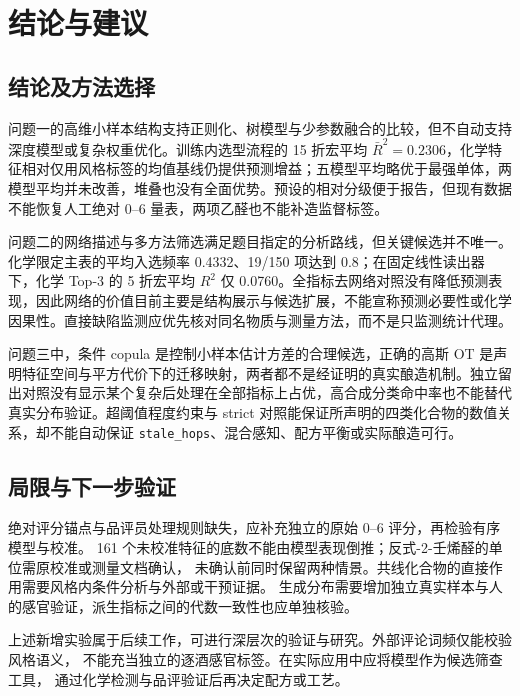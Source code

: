 \documentclass[UTF8,a4paper,zihao=-4]{ctexart}
\numberwithin{figure}{section}
\numberwithin{table}{section}
\numberwithin{equation}{section}
\newcommand{\file}[1]{\texttt{#1}}
\begin{document}
\section{结论与建议}
\label{sec:conclusion}

\subsection{结论及方法选择}

问题一的高维小样本结构支持正则化、树模型与少参数融合的比较，但不自动支持深度模型或复杂权重优化。训练内选型流程的 15 折宏平均 $\bar R^2=0.2306$，化学特征相对仅用风格标签的均值基线仍提供预测增益；五模型平均略优于最强单体，两模型平均并未改善，堆叠也没有全面优势。预设的相对分级便于报告，但现有数据不能恢复人工绝对 0--6 量表，两项乙醛也不能补造监督标签。

问题二的网络描述与多方法筛选满足题目指定的分析路线，但关键候选并不唯一。化学限定主表的平均入选频率 0.4332、19/150 项达到 0.8；在固定线性读出器下，化学 Top-3 的 5 折宏平均 $R^2$ 仅 0.0760。全指标去网络对照没有降低预测表现，因此网络的价值目前主要是结构展示与候选扩展，不能宣称预测必要性或化学因果性。直接缺陷监测应优先核对同名物质与测量方法，而不是只监测统计代理。

问题三中，条件 copula 是控制小样本估计方差的合理候选，正确的高斯 OT 是声明特征空间与平方代价下的迁移映射，两者都不是经证明的真实酿造机制。独立留出对照没有显示某个复杂后处理在全部指标上占优，高合成分类命中率也不能替代真实分布验证。超阈值程度约束与 strict 对照能保证所声明的四类化合物的数值关系，却不能自动保证 \file{stale\_hops}、混合感知、配方平衡或实际酿造可行。

\subsection{局限与下一步验证}

绝对评分锚点与品评员处理规则缺失，应补充独立的原始 0--6 评分，再检验有序模型与校准。
161 个未校准特征的底数不能由模型表现倒推；反式-2-壬烯醛的单位需原校准或测量文档确认，
未确认前同时保留两种情景。共线化合物的直接作用需要风格内条件分析与外部或干预证据。
生成分布需要增加独立真实样本与人的感官验证，派生指标之间的代数一致性也应单独核验。

上述新增实验属于后续工作，可进行深层次的验证与研究。外部评论词频仅能校验风格语义，
不能充当独立的逐酒感官标签。在实际应用中应将模型作为候选筛查工具，
通过化学检测与品评验证后再决定配方或工艺。
\end{document}
